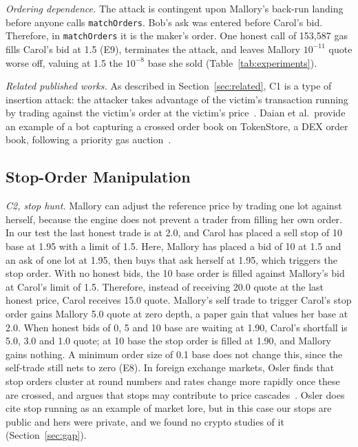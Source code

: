 \emph{Ordering dependence.}
The attack is contingent upon Mallory's back-run landing before anyone calls \texttt{matchOrders}. %
Bob's ask was entered before Carol's bid. Therefore, in \texttt{matchOrders} it is the maker's order. %
One honest call of 153{,}587 gas fills Carol's bid at 1.5 (E9), terminates the attack, and leaves Mallory $10^{-11}$ quote worse off, valuing at 1.5 the $10^{-8}$ base she sold (Table~\ref{tab:experiments}). %

\emph{Related published works.}
As described in Section~\ref{sec:related}, C1 is a type of insertion attack: the attacker takes advantage of the victim's transaction running by trading against the victim's order at the victim's price~\cite{src02eskandari2019}. %
Daian et al.\ provide an example of a bot capturing a crossed order book on TokenStore, a DEX order book, following a priority gas auction~\cite{src01daian2020}. %



\subsection{Stop-Order Manipulation}\label{sec:c23}
\emph{C2, stop hunt.}
Mallory can adjust the reference price by trading one lot against herself, because the engine does not prevent a trader from filling her own order. %
In our test the last honest trade is at 2.0, and Carol has placed a sell stop of 10 base at 1.95 with a limit of 1.5. %
Here, Mallory has placed a bid of 10 at 1.5 and an ask of one lot at 1.95, then buys that ask herself at 1.95, which triggers the stop order. %
With no honest bids, the 10 base order is filled against Mallory's bid at Carol's limit of 1.5. %
Therefore, instead of receiving 20.0 quote at the last honest price, Carol receives 15.0 quote.
Mallory's self trade to trigger Carol's stop order gains Mallory 5.0 quote at zero depth, a paper gain that values her base at 2.0. %
When honest bids of 0, 5 and 10 base are waiting at 1.90, Carol's shortfall is 5.0, 3.0 and 1.0 quote; at 10 base the stop order is filled at 1.90, and Mallory gains nothing. %
A minimum order size of 0.1 base does not change this, since the self-trade still nets to zero (E8). %
In foreign exchange markets, Osler finds that stop orders cluster at round numbers and rates change more rapidly once these are crossed, and argues that stops may contribute to price cascades~\cite{src13osler2002sr}. %
Osler does cite stop running as an example of market lore, but in this case our stops are public and hers were private, and we found no crypto studies of it (Section~\ref{sec:gap}). %

